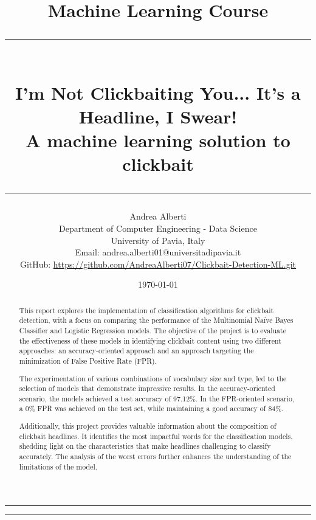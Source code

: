 \documentclass{article}
\title{\Large Machine Learning Course\vspace{0.4cm}\\
    \rule{\textwidth}{0.3pt}\vspace{0.3cm}\\
    \textbf{I'm Not Clickbaiting You... It's a Headline, I Swear!}\vspace{0.2cm}\\
    \large{A machine learning solution to clickbait}
    \rule{\textwidth}{0.3pt}\vspace{0.5cm}}
\author{Andrea Alberti\vspace{0.2cm}\\
    \small Department of Computer Engineering - Data Science\\[0.2cm]
    \small University of Pavia, Italy \\
    \small Email: andrea.alberti01@universitadipavia.it \\
    \small GitHub: \href{https://github.com/AndreaAlberti07/Clickbait-Detection-ML.git}{\underline{https://github.com/AndreaAlberti07/Clickbait-Detection-ML.git}}\vspace{0.5cm}}
\date{\today}
\begin{document}
\begin{titlepage}
   
        \maketitle
        \thispagestyle{empty}

    \begin{multicols*}{2}
            
        \hrule
        \begin{abstract}
        \noindent
        This report explores the implementation of classification algorithms for clickbait detection, with a focus on comparing the 
        performance of the Multinomial Naïve Bayes Classifier and Logistic Regression models. The objective of the project is to 
        evaluate the effectiveness of these models in identifying clickbait content using two different approaches: an accuracy-oriented 
        approach and an approach targeting the minimization of False Positive Rate (FPR).

        The experimentation of various combinations of vocabulary size and type, led to the selection of models that demonstrate impressive 
        results. In the accuracy-oriented scenario, the models achieved a test accuracy of 97.12\%. In the FPR-oriented scenario, a 0\% FPR was 
        achieved on the test set, while maintaining a good accuracy of 84\%.

        Additionally, this project provides valuable information about the composition of clickbait headlines. It identifies the most impactful 
        words for the classification models, shedding light on the characteristics that make headlines challenging to classify accurately. 
        The analysis of the worst errors further enhances the understanding of the limitations of the model.
        \\
        \end{abstract}
     \newcolumn
        \hrule
        \tableofcontents
    \end{multicols*}

\end{titlepage}

\newpage
{}



\end{document}
